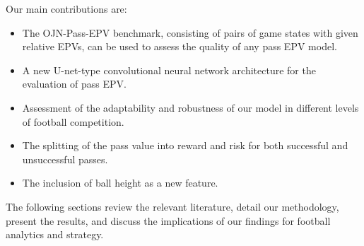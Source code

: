 Our main contributions are:
\begin{itemize}
    \item The OJN-Pass-EPV benchmark, consisting of pairs of game states with given relative EPVs, can be used to assess the quality of any pass EPV model.
    \item A new U-net-type convolutional neural network architecture for the evaluation of pass EPV.
    \item Assessment of the adaptability and robustness of our model in different levels of football competition.
    \item The splitting of the pass value into reward and risk for both successful and unsuccessful passes.
    \item The inclusion of ball height as a new feature.
\end{itemize}

The following sections review the relevant literature, detail our methodology, present the results, and discuss the implications of our findings for football analytics and strategy.
\newpage
